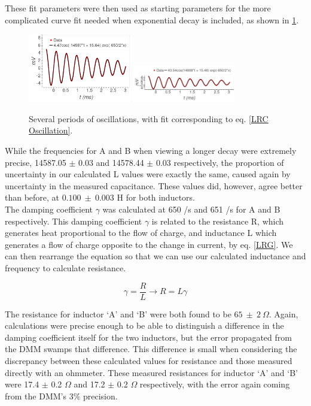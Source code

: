 \documentclass[aps,prl,reprint]{revtex4-2}
\begin{document}
These fit parameters were then used as starting parameters for the more complicated
curve fit needed when exponential decay is included, as shown in \ref{full}. 

\begin{figure}[h]
\includegraphics[width=0.4\textwidth]{../Images/l6_channel_A_full_fit.png}
\includegraphics[width=0.4\textwidth]{../Images/l6_channel_B_full_fit.png}
\caption{\label{full} Several periods of oscillations, with fit corresponding
to eq. \ref{LRC Oscillation}. }
\end{figure}

While the frequencies for A and B when viewing a longer decay
were extremely precise, 14587.05 $\pm$ 0.03 and 14578.44 $\pm$ 0.03
respectively, the proportion of uncertainty in our calculated
L values were exactly the same, caused again by uncertainty in the
measured capacitance. These values did, however, agree better than
before, at $0.100\ \pm\ 0.003$ H for both inductors. \\

The damping coefficient $\gamma$ was calculated at 650 /s and 651 /s for
A and B respectively. This damping coefficient $\gamma$ is related to the
resistance R, which generates heat proportional to the flow of charge,
and inductance L which generates a flow of charge opposite to the
change in current, by eq. \ref{LRG}. We can then rearrange the equation
so that we can use our calculated inductance and frequency to calculate
resistance.

\begin{equation} 
	\gamma = \frac{R}{L} \rightarrow R = L\gamma 
	\label{LRG}
\end{equation}

The resistance for inductor `A' and `B' were both found to be 
$65\ \pm\ 2\ \Omega$. Again, calculations were precise enough
to be able to distinguish a difference in the damping coefficient
itself for the two inductors, but the error propagated from the 
DMM swamps that difference. This difference is small when considering
the discrepancy between these calculated values for resistance and
those measured directly with an ohmmeter. These measured resistances
for inductor `A' and `B' were 17.4 $\pm$ 0.2 $\Omega$ and
17.2 $\pm$ 0.2 $\Omega$ respectively, with the error again coming from
the DMM's 3\% precision. \\
\end{document}
